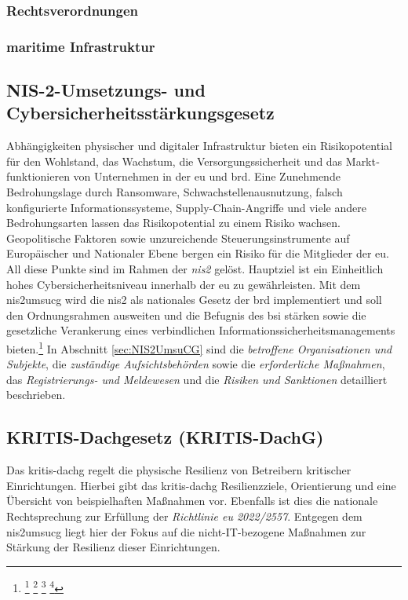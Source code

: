 \documentclass[11pt,a4paper,hidelinks]{article}   %
\begin{document}
            \subsubsection{Rechtsverordnungen}

            \subsubsection{maritime Infrastruktur }

        \subsection{NIS-2-Umsetzungs- und Cybersicherheitsstärkungsgesetz}\label{subsec:NIS2UmsuCG}
            Abhängigkeiten physischer und digitaler Infrastruktur bieten ein Risikopotential für den Wohlstand, das Wachstum, die Versorgungssicherheit und das Markt­funktionieren von Unternehmen in der \gls{eu} und \gls{brd}. Eine Zunehmende Bedrohungslage durch Ransomware, Schwachstellen­ausnutzung, falsch konfigurierte Informationssysteme, Supply-Chain-Angriffe und viele andere Bedrohungsarten lassen das Risikopotential zu einem Risiko wachsen. Geopolitische Faktoren sowie unzureichende Steuerungs­instrumente auf Europäischer und Nationaler Ebene bergen ein Risiko für die Mitglieder der \gls{eu}. All diese Punkte sind im Rahmen der \emph{\gls{nis2}} gelöst. Hauptziel ist ein Einheitlich hohes Cyber­sicherheits­niveau innerhalb der \gls{eu} zu gewährleisten. Mit dem \gls{nis2umsucg} wird die \gls{nis2} als nationales Gesetz der \gls{brd} implementiert und soll den Ordnungs­rahmen ausweiten und die Befugnis des \gls{bsi} stärken sowie die gesetzliche Verankerung eines verbindlichen Informations­sicherheits­managements bieten.\footnote{
                \footcite[Vgl.][, S. 1 - 2]{NIS2UmsuCG}
                \footcite[Vgl.][, Absatz 1, 3 \& 5]{EU2022-2555}
                \footcite[Vgl.][, S. 14 - 15]{bsi:074457}
                \footcite[Vgl.][, S. 9, 12 - 13 \& 37]{enisa:7a4796}
            } In Abschnitt \ref{sec:NIS2UmsuCG} sind die \emph{betroffene Organisationen und Subjekte}, die \emph{zuständige Aufsichtsbehörden} sowie die \emph{erforderliche Maßnahmen}, das \emph{Registrierungs- und Meldewesen} und die \emph{Risiken und Sanktionen} detailliert beschrieben.

        \subsection{KRITIS-Dachgesetz (KRITIS-DachG)} 
            Das \gls{kritis-dachg} regelt die physische Resilienz von Betreibern kritischer Einrichtungen. Hierbei gibt das \gls{kritis-dachg} Resilienzziele, Orientierung und eine Übersicht von beispielhaften Maßnahmen vor. Ebenfalls ist dies die nationale Rechtsprechung zur Erfüllung der \emph{Richtlinie \gls{eu} 2022/2557}. Entgegen dem \gls{nis2umsucg} liegt hier der Fokus auf die nicht-IT-bezogene Maßnahmen zur Stärkung der Resilienz dieser Einrichtungen.
\end{document}
